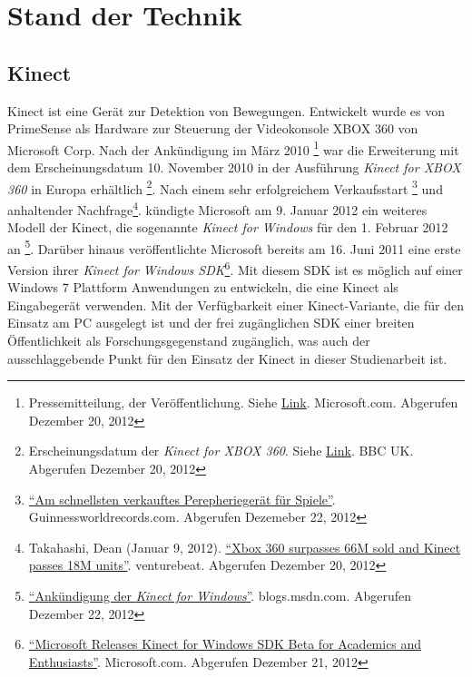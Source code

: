 \chapter{Stand der Technik}
\label{chap:Stand der Technik}

\section{Kinect}
Kinect ist eine Ger\"at zur Detektion von Bewegungen. Entwickelt wurde es von PrimeSense als Hardware zur Steuerung der Videokonsole 
XBOX 360 von Microsoft Corp. Nach der Ank\"undigung im M\"arz 2010 \footnote{Pressemitteilung, der Ver\"offentlichung. Siehe \href{https://www.microsoft.com/en-us/news/press/2010/mar10/03-31PrimeSensePR.aspx}{Link}. Microsoft.com.  Abgerufen Dezember 20, 2012}
war die Erweiterung mit dem Erscheinungsdatum 10. November 2010 in der Ausf\"uhrung \textit{Kinect for XBOX 360} in Europa erh\"altlich \footnote{Erscheinungsdatum der \textit{Kinect for XBOX 360}. Siehe \href{http://www.bbc.co.uk/newsbeat/10996389}{Link}. BBC UK. Abgerufen Dezember 20, 2012}.
Nach einem sehr erfolgreichem Verkaufsstart \footnote{\href{http://www.guinnessworldrecords.com/records-9000/fastest-selling-gaming-peripheral/}{\enquote{Am schnellsten verkauftes Perepherieger\"at f\"ur Spiele}}. Guinnessworldrecords.com. Abgerufen Dezemeber 22, 2012}
und anhaltender Nachfrage\footnote{Takahashi, Dean (Januar 9, 2012). \href{http://venturebeat.com/2012/01/09/xbox-360-surpassed-66m-sold-and-kinect-has-sold-18m-units/}{\enquote{Xbox 360 surpasses 66M sold and Kinect passes 18M units}}. venturebeat. Abgerufen Dezember 20, 2012}.
k\"undigte Microsoft am 9. Januar 2012 ein weiteres Modell der Kinect, die sogenannte \textit{Kinect for Windows} f\"ur den 1. Februar 2012 an \footnote{\href{https://blogs.msdn.com/b/kinectforwindows/archive/2012/01/09/kinect-for-windows-commercial-program-announced.aspx?Redirected=true}{\enquote{Ank\"undigung der \textit{Kinect for Windows}}}. blogs.msdn.com. Abgerufen Dezember 22, 2012}.
\newline
Dar\"uber hinaus ver\"offentlichte Microsoft bereits am 16. Juni 2011 eine erste Version ihrer \textit{Kinect for Windows SDK}\footnote{\href{https://www.microsoft.com/en-us/news/press/2011/jun11/06-16MSKinectSDKPR.aspx}{\enquote{Microsoft Releases Kinect for Windows SDK Beta for Academics and Enthusiasts}}. Microsoft.com. Abgerufen Dezember 21, 2012}.
Mit diesem \gls{SDK} ist es m\"oglich auf einer Windows 7 Plattform Anwendungen zu entwickeln, die eine Kinect als Eingabeger\"at verwenden.
\newline
Mit der Verf\"ugbarkeit einer Kinect-Variante, die f\"ur den Einsatz am PC ausgelegt ist und der frei zug\"anglichen \acrshort{SDK} einer breiten \"Offentlichkeit als Forschungsgegenstand zug\"anglich, 
was auch der ausschlaggebende Punkt f\"ur den Einsatz der Kinect in dieser Studienarbeit ist.
